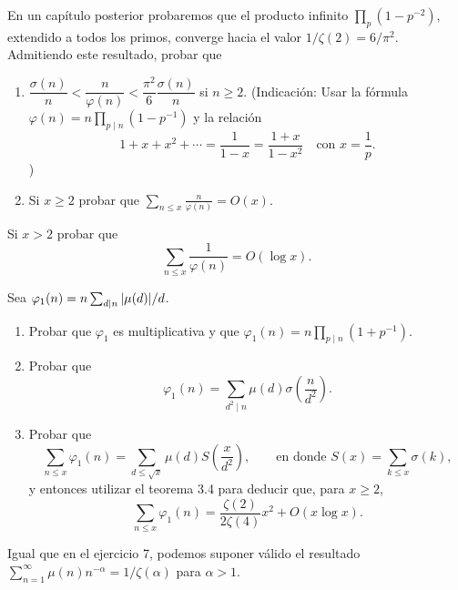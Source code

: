 \documentclass[12pt,a4paper]{book}
\begin{document}
    \begin{ejercicio}
        En un capítulo posterior probaremos que el producto infinito $\prod_p(1-p^{-2})$,
        extendido a todos los primos, converge hacia el valor $1/\zeta(2)=6/\pi^2$.
        Admitiendo este resultado, probar que
        \begin{enumerate}
            \item[(a)] $\dfrac{\sigma(n)}{n}<\dfrac{n}{\varphi(n)}<\dfrac{\pi^2}{6}\dfrac{\sigma(n)}{n}$
            si $n\geq2$. (Indicación: Usar la fórmula $\varphi(n)=n\prod_{p\mid n}(1-p^{-1})$
            y la relación
            \begin{equation*}
                1+x+x^2+\cdots=\frac{1}{1-x}=\frac{1+x}{1-x^2}\quad\text{con } x=\frac{1}{p}.
            \end{equation*})
            \item[(b)] Si $x\geq2$ probar que $\displaystyle\sum_{n\leq x}\frac{n}{\varphi(n)}=O(x)$.
        \end{enumerate}
    \end{ejercicio}

    \begin{ejercicio}
        Si $x>2$ probar que
        \begin{equation*}
            \sum_{n\leq x}\frac{1}{\varphi(n)}=O(\log x).
        \end{equation*}
    \end{ejercicio}

    \begin{ejercicio}
        Sea $\varphi_1(n)=n\sum_{d\mid n}\abs{\mu(d)}/d$.
        \begin{enumerate}
            \item[(a)] Probar que $\varphi_1$ es multiplicativa y que
            $\varphi_1(n)=n\prod_{p\mid n}(1+p^{-1})$.
            \item[(b)] Probar que
            \begin{equation*}
                \varphi_1(n)=\sum_{d^2\mid n}\mu(d)\sigma\left(\frac{n}{d^2}\right).
            \end{equation*}
            \item[(c)] Probar que
            \begin{equation*}
                \sum_{n\leq x}\varphi_1(n)=\sum_{d\leq\sqrt x}\mu(d)S\left(\frac{x}{d^2}\right),
                \qquad\text{en donde } S(x)=\sum_{k\leq x}\sigma(k),
            \end{equation*}
            y entonces utilizar el teorema 3.4 para deducir que, para $x\geq2$,
            \begin{equation*}
                \sum_{n\leq x}\varphi_1(n)=\frac{\zeta(2)}{2\zeta(4)}x^2+O(x\log x).
            \end{equation*}
        \end{enumerate}
        Igual que en el ejercicio 7, podemos suponer válido el resultado
        $\sum_{n=1}^{\infty}\mu(n)n^{-\alpha}=1/\zeta(\alpha)$ para $\alpha>1$.
    \end{ejercicio}
\end{document}
